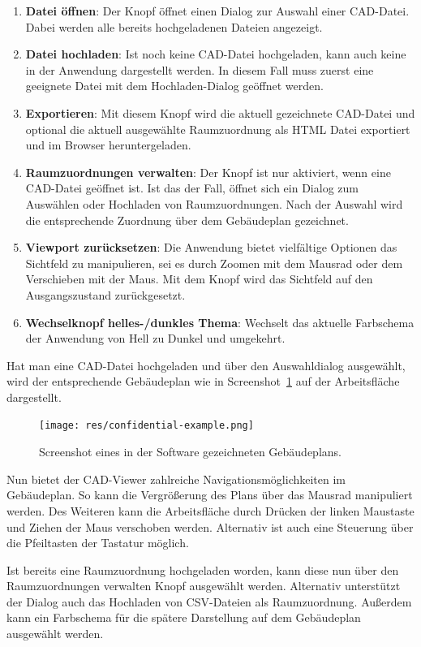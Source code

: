 \begin{enumerate}
    \item \textbf{Datei öffnen}: Der Knopf öffnet einen Dialog zur Auswahl einer CAD-Datei.
    Dabei werden alle bereits hochgeladenen Dateien angezeigt.
    \item \textbf{Datei hochladen}: Ist noch keine CAD-Datei hochgeladen, kann auch keine in der Anwendung dargestellt werden.
    In diesem Fall muss zuerst eine geeignete Datei mit dem Hochladen-Dialog geöffnet werden.
    \item \textbf{Exportieren}: Mit diesem Knopf wird die aktuell gezeichnete CAD-Datei und optional die aktuell ausgewählte Raumzuordnung als HTML Datei exportiert und im Browser heruntergeladen.
    \item \textbf{Raumzuordnungen verwalten}: Der Knopf ist nur aktiviert, wenn eine CAD-Datei geöffnet ist.
    Ist das der Fall, öffnet sich ein Dialog zum Auswählen oder Hochladen von Raumzuordnungen.
    Nach der Auswahl wird die entsprechende Zuordnung über dem Gebäudeplan gezeichnet.
    \item \textbf{Viewport zurücksetzen}: Die Anwendung bietet vielfältige Optionen das Sichtfeld zu manipulieren, sei es durch Zoomen mit dem Mausrad oder dem Verschieben mit der Maus.
    Mit dem Knopf wird das Sichtfeld auf den Ausgangszustand zurückgesetzt.
    \item \textbf{Wechselknopf helles-/dunkles Thema}: Wechselt das aktuelle Farbschema der Anwendung von Hell zu Dunkel und umgekehrt.
\end{enumerate}

Hat man eine CAD-Datei hochgeladen und über den Auswahldialog ausgewählt, wird der entsprechende Gebäudeplan wie in Screenshot~\ref{fig:app-screenshot-plan} auf der Arbeitsfläche dargestellt.

\begin{figure}
    \texttt{[image: res/confidential-example.png]}
    \caption{Screenshot eines in der Software gezeichneten Gebäudeplans.}
    \label{fig:app-screenshot-plan}
\end{figure}

Nun bietet der CAD-Viewer zahlreiche Navigationsmöglichkeiten im Gebäudeplan.
So kann die Vergrößerung des Plans über das Mausrad manipuliert werden.
Des Weiteren kann die Arbeitsfläche durch Drücken der linken Maustaste und Ziehen der Maus verschoben werden.
Alternativ ist auch eine Steuerung über die Pfeiltasten der Tastatur möglich.

Ist bereits eine Raumzuordnung hochgeladen worden, kann diese nun über den \glqq{}Raumzuordnungen verwalten\grqq{} Knopf ausgewählt werden.
Alternativ unterstützt der Dialog auch das Hochladen von CSV-Dateien als Raumzuordnung.
Außerdem kann ein Farbschema für die spätere Darstellung auf dem Gebäudeplan ausgewählt werden.

